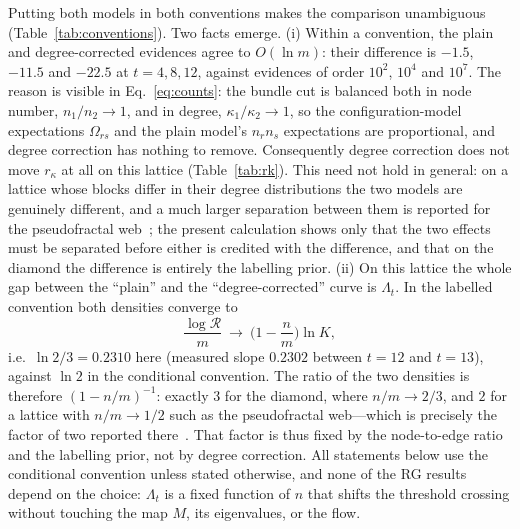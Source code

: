 \documentclass[preprint,12pt]{elsarticle}
\newcommand{\Rev}{\mathcal{R}}
\newcommand{\logR}{\log \Rev}
\newcommand{\rk}{r_{\kappa}}
\newcommand{\Om}{\Omega}
\begin{document}
Putting both models in both conventions makes the comparison unambiguous
(Table~\ref{tab:conventions}). Two facts emerge. (i) Within a convention, the
plain and degree-corrected evidences agree to $O(\ln m)$: their difference is
$-1.5$, $-11.5$ and $-22.5$ at $t=4,8,12$, against evidences of order
$10^2$, $10^4$ and $10^7$. The reason is visible in Eq.~\eqref{eq:counts}: the
bundle cut is balanced both in node number, $n_1/n_2\to1$, and in degree,
$\kappa_1/\kappa_2\to1$, so the configuration-model expectations $\Om_{rs}$ and
the plain model's $n_rn_s$ expectations are proportional, and degree correction
has nothing to remove. Consequently degree correction does not move $\rk$ at
all on this lattice (Table~\ref{tab:rk}). This need not hold in general: on a
lattice whose blocks differ in their degree distributions the two models are
genuinely different, and a much larger separation between them is reported for
the pseudofractal web~\cite{vazquez2026communitystructurepseudofractalweb};
the present calculation shows only that the two effects must be separated
before either is credited with the difference, and that on the diamond the
difference is entirely the labelling prior. (ii) On this
lattice the whole gap between the ``plain'' and the ``degree-corrected'' curve
is $\Lambda_t$. In the labelled convention both densities converge to
\begin{equation}
  \frac{\logR}{m}\ \longrightarrow\ \Big(1-\frac{n}{m}\Big)\ln K ,
  \label{eq:labelled_density}
\end{equation}
i.e.\ $\ln 2/3=0.2310$ here (measured slope $0.2302$ between $t=12$ and
$t=13$), against $\ln2$ in the conditional convention. The ratio of the two
densities is therefore $(1-n/m)^{-1}$: exactly $3$ for the diamond, where
$n/m\to2/3$, and $2$ for a lattice with $n/m\to1/2$ such as the pseudofractal
web---which is precisely the factor of two reported
there~\cite{vazquez2026communitystructurepseudofractalweb}. That factor is thus fixed
by the node-to-edge ratio and the labelling prior, not by degree correction. All statements below use
the conditional convention unless stated otherwise, and none of the RG results
depend on the choice: $\Lambda_t$ is a fixed function of $n$ that shifts the
threshold crossing without touching the map $M$, its eigenvalues, or the flow.
\end{document}
